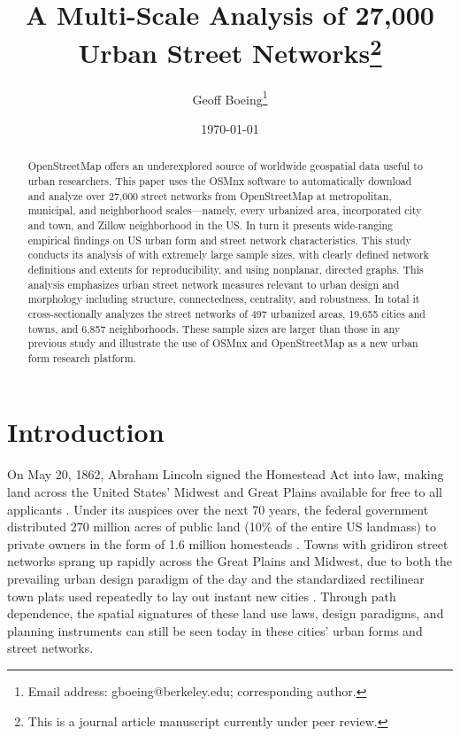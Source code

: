 \documentclass{article}
\begin{document}
\title{A Multi-Scale Analysis of 27,000 Urban Street Networks\footnote{This is a journal article manuscript currently under peer review.}}
\author{Geoff Boeing\footnote{Email address: gboeing@berkeley.edu; corresponding author.}}
\date{\today}
\maketitle



\begin{abstract}
	
OpenStreetMap offers an underexplored source of worldwide geospatial data useful to urban researchers. This paper uses the OSMnx software to automatically download and analyze over 27,000 street networks from OpenStreetMap at metropolitan, municipal, and neighborhood scales---namely, every urbanized area, incorporated city and town, and Zillow neighborhood in the US. In turn it presents wide-ranging empirical findings on US urban form and street network characteristics. This study conducts its analysis of with extremely large sample sizes, with clearly defined network definitions and extents for reproducibility, and using nonplanar, directed graphs. This analysis emphasizes urban street network measures relevant to urban design and morphology including structure, connectedness, centrality, and robustness. In total it cross-sectionally analyzes the street networks of 497 urbanized areas, 19,655 cities and towns, and 6,857 neighborhoods. These sample sizes are larger than those in any previous study and illustrate the use of OSMnx and OpenStreetMap as a new urban form research platform.

\end{abstract}



\section{Introduction}

On May 20, 1862, Abraham Lincoln signed the Homestead Act into law, making land across the United States' Midwest and Great Plains available for free to all applicants \cite{porterfield_homestead_2005}. Under its auspices over the next 70 years, the federal government distributed 270 million acres of public land (10\% of the entire US landmass) to private owners in the form of 1.6 million homesteads \cite{lee_kansas_1979, sherraden_inclusion_2005}. Towns with gridiron street networks sprang up rapidly across the Great Plains and Midwest, due to both the prevailing urban design paradigm of the day and the standardized rectilinear town plats used repeatedly to lay out instant new cities \cite{southworth_streets_1997}. Through path dependence, the spatial signatures of these land use laws, design paradigms, and planning instruments can still be seen today in these cities' urban forms and street networks.
\end{document}
